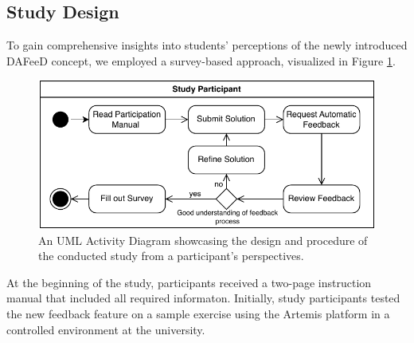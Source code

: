 \documentclass[manuscript,screen,review]{acmart}
\begin{document}

\subsection{Study Design}
To gain comprehensive insights into students' perceptions of the newly introduced DAFeeD concept, we employed a survey-based approach, visualized in Figure \ref{fig:Study-Design}.
\begin{figure}[htbp]
  \centering
  \includegraphics[width=0.7\linewidth]{figures/Study-Design.pdf}
  \caption{An UML Activity Diagram showcasing the design and procedure of the conducted study from a participant's perspectives.}
  \label{fig:Study-Design}
\end{figure}
At the beginning of the study, participants received a two-page instruction manual that included all required informaton. 
Initially, study participants tested the new feedback feature on a sample exercise using the Artemis platform in a controlled environment at the university.
\end{document}
